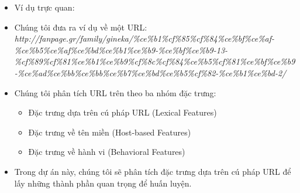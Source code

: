 \documentclass[13pt]{article}
\begin{document}
\begin{itemize}
    \item Ví dụ trực quan: 
    \item Chúng tôi đưa ra ví dụ về một URL: \\
    \textit{http://fanpage.gr/family/gineka/\%ce\%b1\%cf\%85\%cf\%84\%ce\%bf\%ce\%af-\%ce\%b5\%ce\%af\%ce\%bd\%ce\%b1\%ce\%b9-\%ce\%bf\%ce\%b9-13-\%cf\%89\%cf\%81\%ce\%b1\%ce\%b9\%cf\%8c\%cf\%84\%ce\%b5\%cf\%81\%ce\%bf\%ce\%b9-\%ce\%ad\%ce\%bb\%ce\%bb\%ce\%b7\%ce\%bd\%ce\%b5\%cf\%82-\%ce\%b1\%ce\%bd-2/}

    \item Chúng tôi phân tích URL trên theo ba nhóm đặc trưng: 
    \begin{itemize}
        \item Đặc trưng dựa trên cú pháp URL (Lexical Features)
        \item Đặc trưng về tên miền (Host-based Features)
        \item Đặc trưng về hành vi (Behavioral Features)
    \end{itemize}
    \item Trong dự án này, chúng tôi sẽ phân tích đặc trưng dựa trên cú pháp URL để lấy những thành phần quan trọng để huấn luyện.
\end{itemize}
\end{document}
